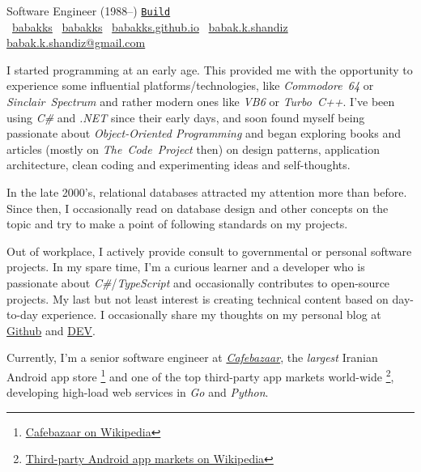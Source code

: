 \documentclass[10pt,a4paper]{article}
\begin{document}
%
{Software Engineer (1988--)}%
{\href{https://github.com/babakks/my-resume}{\tiny\color{gray}\texttt{Build\buildno}}}
\\
\noindent
\githubmark~\href{https://github.com/babakks}{babakks}
\headerentrybreak
\devbadge~\href{https://dev.to/babakks}{babakks}
\headerentrybreak
{}~\href{https://babakk.github.io}{babakks.github.io}
\hfill
\skypeicon~\href{skype:live:babak.k.shandiz}{babak.k.shandiz}
\headerentrybreak
{}~%
\href{mailto:babak.k.shandiz@gmail.com}{babak.k.shandiz@gmail.com}

\spacedhrule{0.9em}{-0.4em}

\vspace{-1.3em} %
\begin{multicols}{2}  %
    \noindent
    I started programming at an early age. This provided me with the opportunity
    to experience some influential platforms/technologies, like
    \textit{Commodore~64} or \textit{Sinclair~Spectrum} and rather modern ones
    like \textit{VB6} or \textit{Turbo~C++}. I've been using \textit{C\#} and
    \textit{.NET} since their early days, and soon found myself being passionate
    about \textit{Object-Oriented Programming} and began exploring books and
    articles (mostly on \textit{The~Code~Project} then) on design patterns,
    application architecture, clean coding and experimenting ideas and
    self-thoughts.

    In the late 2000's, relational databases attracted my attention more than
    before. Since then, I occasionally read on database design and other
    concepts on the topic and try to make a point of following standards on my
    projects.

    Out of workplace, I actively provide consult to governmental or personal
    software projects. In my spare time, I'm a curious learner and a developer who
    is passionate about \textit{C\#}/\textit{TypeScript} and occasionally
    contributes to open-source projects. My last but not least interest is
    creating technical content based on day-to-day experience. I
    occasionally share my thoughts on my personal blog at
    \href{https://babakks.github.io}{Github} and
    \href{https://dev.to/babakks}{DEV}.

    Currently, I'm a senior software engineer at
    \href{https://cafebazaar.ir}{\emph{Cafebazaar}}, the \textit{largest}
    Iranian Android app store%
    \footnote{\label{cb-on-wiki}%
        \href{https://en.wikipedia.org/wiki/Cafe\_Bazaar}{Cafebazaar on Wikipedia}}%
    and one of the top third-party app markets world-wide%
    \footnote{\label{3rd-party-stores-on-wiki}%
        \href{https://en.wikipedia.org/wiki/List\_of\_mobile\_app\_distribution\_platforms\#Third-party\_platforms}%
        {Third-party Android app markets on Wikipedia}},
    developing high-load web services in \textit{Go} and \textit{Python}.
\end{multicols}
\spacedhrule{0.5em}{-0.4em}
\end{document}
